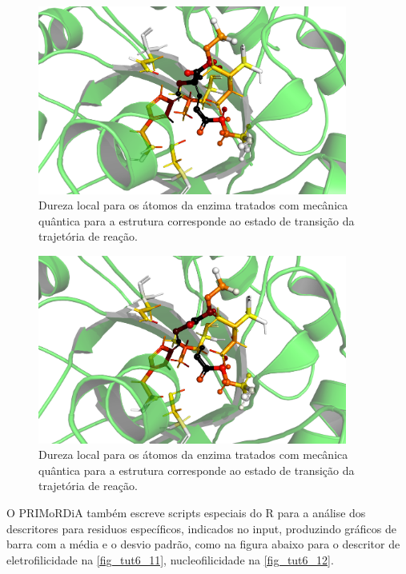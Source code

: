 \documentclass[a4paper,11pt]{refart}
\begin{document}
\hspace*{-\leftmarginwidth}
\begin{minipage}{\fullwidth}
	\begin{figure}[H]
		\begin{center}
			\includegraphics[width=4in]{images/tut6_img10}
			\caption{Dureza local para os átomos da enzima tratados com mecânica quântica para a estrutura corresponde ao estado de transição da trajetória de reação.}
			\label{fig_tut6_9}
		\end{center}
	\end{figure}
\end{minipage}


\hspace*{-\leftmarginwidth}
\begin{minipage}{\fullwidth}
	\begin{figure}[H]
		\begin{center}
			\includegraphics[width=4in]{images/tut6_img11}
			\caption{Dureza local para os átomos da enzima tratados com mecânica quântica para a estrutura corresponde ao estado de transição da trajetória de reação.}
			\label{fig_tut6_10}
		\end{center}
	\end{figure}
\end{minipage}

O PRIMoRDiA também escreve scripts especiais do R para a análise dos descritores para residuos específicos, indicados no input, produzindo gráficos de barra com a média e o desvio padrão, como na figura abaixo para o descritor de eletrofilicidade na \autoref{fig_tut6_11}, nucleofilicidade na \autoref{fig_tut6_12}.
\end{document}
